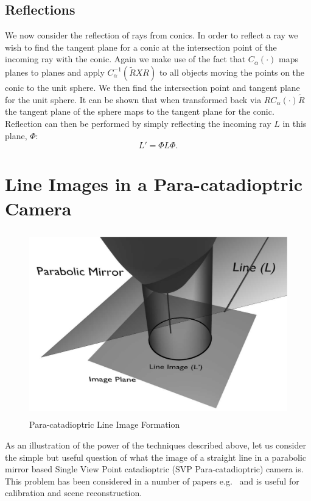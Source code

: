 \subsection{Reflections}
\label{sec:Ref}
We now consider the reflection of rays from conics. In order to
reflect a ray we wish to find the tangent plane for a conic at the 
intersection point of the incoming ray with the conic. Again we
make use of the fact that $C_\alpha(\cdot)$ maps planes to
planes and apply $C_\alpha^{-1}(\tilde{R}XR)$ to all objects moving the
points on the conic to the unit sphere. We then find the intersection
point and tangent plane for the unit sphere. It can be shown \cite{jic23fyr}
that when transformed back via $RC_\alpha(\cdot)\tilde{R}$ the tangent
plane of the sphere maps to the tangent plane for the conic. Reflection
can then be performed by simply reflecting the incoming ray $L$ in
this plane, $\Phi$:
\[
L' = \Phi L \Phi.
\]
\section{Line Images in a Para-catadioptric Camera}
\begin{figure}[ht]
\includegraphics[height=8cm]{testparaboloid2}
\caption{Para-catadioptric Line Image Formation}
\label{fig:bob}
\end{figure}
As an illustration of the power of the techniques described above, let us consider the simple but
 useful question of what the image of a straight line in a parabolic mirror based Single View Point 
catadioptric (SVP Para-catadioptric) camera is.  This problem has been considered in a number 
of papers e.g.\ \cite{CAM:gd, CAM:YH04, CAM:BA03b, CAM:bclf} and is useful for calibration 
and scene reconstruction.

